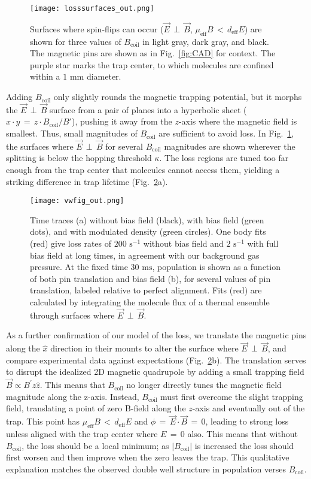 \documentclass[%
 reprint,
 amsmath,amssymb,
 aps,
prl,
]{revtex4-1}
\newcommand{\bcl}{{$B_\text{coil}$}}
\newcommand{\epb}{{$\vec{E}\,{\perp}\,\vec{B}$}}
\begin{document}
\begin{figure}[tb]
\texttt{[image: losssurfaces\_out.png]}%
\caption{
Surfaces where spin-flips can occur (\epb{}, $\mu_\text{eff}B\,{<}\,d_\text{eff}E$) are shown for three values of \bcl{} in light gray, dark gray, and black. 
The magnetic pins are shown as in Fig.~\ref{fig:CAD} for context. 
The purple star marks the trap center, to which molecules are confined within a \raisebox{2.5px}{\texttildelow} $\!\!1\text{ mm}$ diameter.
}
\label{fig:LSurfs}
\end{figure}

Adding \bcl{} only slightly rounds the magnetic trapping potential, but it morphs the \epb{} surface from a pair of planes into a hyperbolic sheet ($x\cdot y\,{=}\, z\cdot B_\text{coil}/B'$), pushing it away from the $z$-axis where the magnetic field is smallest. 
Thus, small magnitudes of \bcl{} are sufficient to avoid loss. 
In Fig.~\ref{fig:LSurfs}, the surfaces where \epb{} for several \bcl{} magnitudes are shown wherever the splitting is below the hopping threshold $\kappa$. 
The loss regions are tuned too far enough from the trap center that molecules cannot access them, yielding a striking difference in trap lifetime (Fig.~\ref{fig:WVplot}a).

\begin{figure}[tb]
\texttt{[image: vwfig\_out.png]}%
\caption{
Time traces (a) without bias field (black), with bias field (green dots), and with modulated density (green circles). 
One body fits (red) give loss rates of $200\text{ s}^{-1}$ without bias field and $2\text{ s}^{-1}$ with full bias field at long times, in agreement with our background gas pressure. 
At the fixed time $30\text{ ms}$, population is shown as a function of both pin translation and bias field (b), for several values of pin translation, labeled relative to perfect alignment. 
Fits (red) are calculated by integrating the molecule flux of a thermal ensemble through surfaces where \epb.
\label{fig:WVplot}}
\end{figure}

As a further confirmation of our model of the loss, we translate the magnetic pins along the $\hat{x}$ direction in their mounts to alter the surface where \epb{}, and compare experimental data against expectations (Fig.~\ref{fig:WVplot}b). 
The translation serves to disrupt the idealized 2D magnetic quadrupole by adding a small trapping field $\vec{B}\propto B^\prime z\hat{z}$. 
This means that \bcl{} no longer directly tunes the magnetic field magnitude along the z-axis. 
Instead, \bcl{} must first overcome the slight trapping field, translating a point of zero B-field along the $z$-axis and eventually out of the trap. This point has $\mu_\text{eff}B\,{<}\,d_\text{eff}E$ and $\phi\,{=}\,\vec{E}\cdot\vec{B}\,{=}\,0$, leading to strong loss unless aligned with the trap center where $E\,{=}\,0$ also. 
This means that without \bcl{}, the loss should be a local minimum; as $|B_\text{coil}|$ is increased the loss should first worsen and then improve when the zero leaves the trap. 
This qualitative explanation matches the observed double well structure in population verses \bcl.
\end{document}
